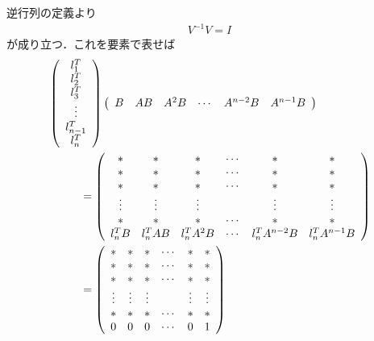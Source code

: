 逆行列の定義より
\begin{align}
 V^{-1} V = I
\end{align}
が成り立つ．これを要素で表せば
\begin{align}
	&
	\left(\begin{array}{c}
		 l_1^T \\
		 l_2^T \\
		 l_3^T \\
		 \vdots \\
		 l_{n-1}^T \\
		 l_n^T
	\end{array}\right)
	\left(\begin{array}{cccccc}
            B & A B & A^2 B & \cdots &A^{n-2}B &  A^{n-1} B
	\end{array}\right)
\nonumber\\
	& \hspace*{1cm}=
	\left(\begin{array}{cccccc}
		 *       & *         & *           & \cdots & *              & *              \\
		 *       & *         & *           & \cdots & *              & *              \\
		 *       & *         & *           & \cdots & *              & *              \\
		 \vdots  & \vdots    & \vdots      &        & \vdots         & \vdots         \\
		 *       & *         & *           & \cdots & *              & *              \\
		 l_n^T B & l_n^T A B & l_n^T A^2 B & \cdots & l_n^T A^{n-2}B & l_n^T A^{n-1}B
	\end{array}\right)
\nonumber\\
	& \hspace*{1cm}=
	\left(\begin{array}{cccccc}
		 *       & *         & *           & \cdots & *              & *              \\
		 *       & *         & *           & \cdots & *              & *              \\
		 *       & *         & *           & \cdots & *              & *              \\
		 \vdots  & \vdots    & \vdots      &        & \vdots         & \vdots         \\
		 *       & *         & *           & \cdots & *              & *              \\
		 0       & 0         & 0           & \cdots & 0              & 1
	\end{array}\right)
\end{align}
